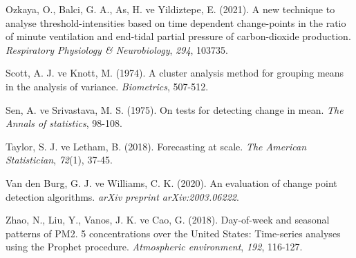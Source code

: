 \documentclass[12pt,twoside]{deuthesis}
\begin{document}
\begin{CSLReferences}{1}{0}
Ozkaya, O., Balci, G. A., As, H. ve Yildiztepe, E. (2021). A new technique to analyse threshold-intensities based on time dependent change-points in the ratio of minute ventilation and end-tidal partial pressure of carbon-dioxide production. \emph{Respiratory Physiology \& Neurobiology}, \emph{294}, 103735.

Scott, A. J. ve Knott, M. (1974). A cluster analysis method for grouping means in the analysis of variance. \emph{Biometrics}, 507-512.

Sen, A. ve Srivastava, M. S. (1975). On tests for detecting change in mean. \emph{The Annals of statistics}, 98-108.

Taylor, S. J. ve Letham, B. (2018). Forecasting at scale. \emph{The American Statistician}, \emph{72}(1), 37-45.

Van den Burg, G. J. ve Williams, C. K. (2020). An evaluation of change point detection algorithms. \emph{arXiv preprint arXiv:2003.06222}.

Zhao, N., Liu, Y., Vanos, J. K. ve Cao, G. (2018). Day-of-week and seasonal patterns of PM2. 5 concentrations over the United States: Time-series analyses using the Prophet procedure. \emph{Atmospheric environment}, \emph{192}, 116-127.

\end{CSLReferences}

\setlength{\parindent}{-0.20in}
\setlength{\leftskip}{0.20in}
\setlength{\parskip}{8pt}
\end{document}
